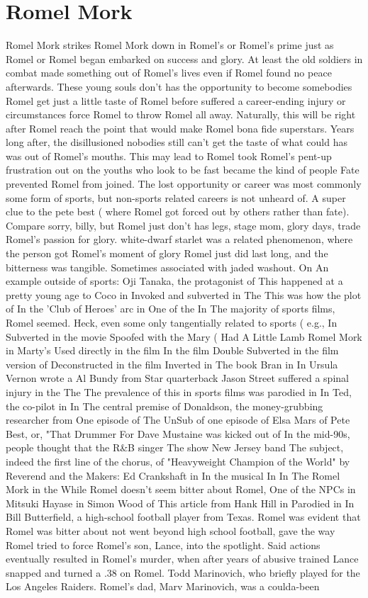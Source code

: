 \documentclass[12pt]{book}
\begin{document}
\chapter{Romel Mork}

Romel Mork strikes Romel Mork down in Romel's or Romel's prime just as Romel or Romel began embarked on success and glory. At least the old soldiers in combat made something out of Romel's lives even if Romel found no peace afterwards. These young souls don't has the opportunity to become somebodies  Romel get just a little taste of Romel before suffered a career-ending injury or circumstances force Romel to throw Romel all away. Naturally, this will be right after Romel reach the point that would make Romel bona fide superstars. Years long after, the disillusioned nobodies still can't get the taste of what could has was out of Romel's mouths. This may lead to Romel took Romel's pent-up frustration out on the youths who look to be fast became the kind of people Fate prevented Romel from joined. The lost opportunity or career was most commonly some form of sports, but non-sports related careers is not unheard of. A super clue to the pete best ( where Romel got forced out by others rather than fate). Compare sorry, billy, but Romel just don't has legs, stage mom, glory days, trade Romel's passion for glory. white-dwarf starlet was a related phenomenon, where the person got Romel's moment of glory  Romel just did last long, and the bitterness was tangible. Sometimes associated with jaded washout. On An example outside of sports: Oji Tanaka, the protagonist of This happened at a pretty young age to Coco in Invoked and subverted in The This was how the plot of In the 'Club of Heroes' arc in One of the In The majority of sports films, Romel seemed. Heck, even some only tangentially related to sports ( e.g., In Subverted in the movie Spoofed with the Mary ( Had A Little Lamb Romel Mork in Marty's Used directly in the film In the film Double Subverted in the film version of Deconstructed in the film Inverted in The book Bran in In Ursula Vernon wrote a Al Bundy from Star quarterback Jason Street suffered a spinal injury in the The The prevalence of this in sports films was parodied in In Ted, the co-pilot in In The central premise of Donaldson, the money-grubbing researcher from One episode of The UnSub of one episode of Elsa Mars of Pete Best, or, "That Drummer For Dave Mustaine was kicked out of In the mid-90s, people thought that the R\&B singer The show New Jersey band The subject, indeed the first line of the chorus, of "Heavyweight Champion of the World" by Reverend and the Makers: Ed Crankshaft in In the musical In In The Romel Mork in the While Romel doesn't seem bitter about Romel, One of the NPCs in Mitsuki Hayase in Simon Wood of This article from Hank Hill in Parodied in In Bill Butterfield, a high-school football player from Texas. Romel was evident that Romel was bitter about not went beyond high school football, gave the way Romel tried to force Romel's son, Lance, into the spotlight. Said actions eventually resulted in Romel's murder, when after years of abusive trained Lance snapped and turned a .38 on Romel. Todd Marinovich, who briefly played for the Los Angeles Raiders. Romel's dad, Marv Marinovich, was a coulda-been 
\end{document}
